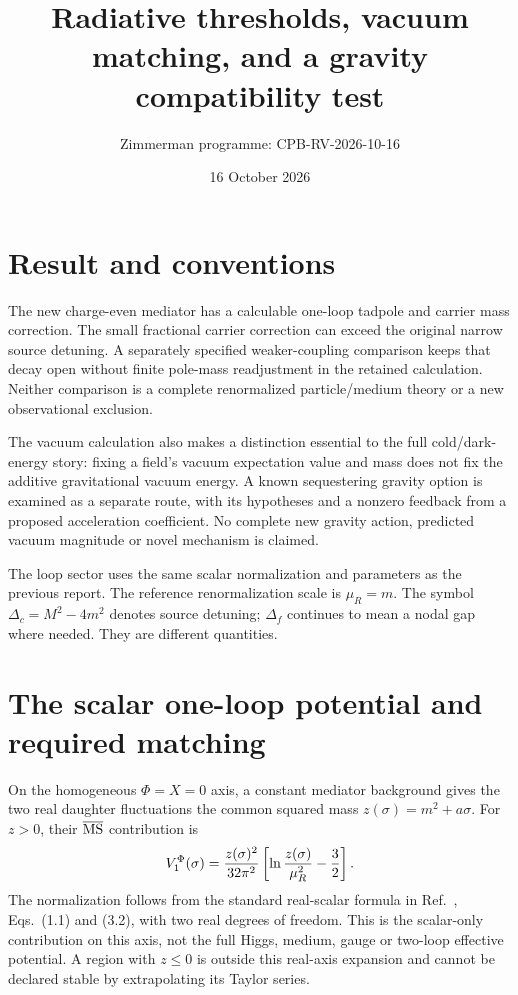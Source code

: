 \documentclass[11pt]{article}
\title{Radiative thresholds, vacuum matching, and a gravity compatibility test}
\author{Zimmerman programme: CPB-RV-2026-10-16}
\date{16 October 2026}
\begin{document}
\maketitle
\section{Result and conventions}
The new charge-even mediator has a calculable one-loop tadpole and carrier
mass correction. The small fractional carrier correction can exceed the
original narrow source detuning. A separately specified weaker-coupling
comparison keeps that decay open without finite pole-mass readjustment in
the retained calculation. Neither comparison is a complete renormalized
particle/medium theory or a new observational exclusion.

The vacuum calculation also makes a distinction essential to the full
cold/dark-energy story: fixing a field's vacuum expectation value and mass
does not fix the additive gravitational vacuum energy. A known sequestering
gravity option is examined as a separate route, with its hypotheses and a
nonzero feedback from a proposed acceleration coefficient. No complete new
gravity action, predicted vacuum magnitude or novel mechanism is claimed.

The loop sector uses the same scalar normalization and parameters as the
previous report. The reference renormalization scale is $\mu_R=m$.
The symbol $\Delta_c=M^2-4m^2$ denotes source detuning; $\Delta_f$
continues to mean a nodal gap where needed. They are different quantities.

\section{The scalar one-loop potential and required matching}
On the homogeneous $\Phi=X=0$ axis, a constant mediator background gives
the two real daughter fluctuations the common squared mass
$z(\sigma)=m^2+a\sigma$. For $z>0$, their
$\overline{\rm MS}$ contribution is
\begin{equation}
 V_1^\Phi(\sigma)={z(\sigma)^2\over32\pi^2}
       \left[\ln{z(\sigma)\over\mu_R^2}-{3\over2}\right].
 \label{rv:CW}
\end{equation}
The normalization follows from the standard real-scalar formula in
Ref.~\cite{rv:martin}, Eqs.~(1.1) and (3.2), with two real degrees of
freedom. This is the scalar-only contribution on this axis, not the full
Higgs, medium, gauge or two-loop effective potential. A region with
$z\leq0$ is outside this real-axis expansion and cannot be declared stable
by extrapolating its Taylor series.
\end{document}
